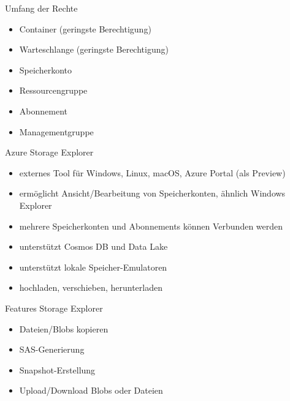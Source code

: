 \begin{flashcard}[Definition]{Umfang der Rechte}
    \begin{itemize}
        \item Container (geringste Berechtigung)
        \item Warteschlange (geringste Berechtigung)
        \item Speicherkonto
        \item Ressourcengruppe
        \item Abonnement
        \item Managementgruppe
    \end{itemize}
\end{flashcard}


\begin{flashcard}[Definition]{Azure Storage Explorer}
    \begin{itemize}
        \item externes Tool für Windows, Linux, macOS, Azure Portal (als Preview)
        \item ermöglicht Ansicht/Bearbeitung von Speicherkonten, ähnlich Windows Explorer
        \item mehrere Speicherkonten und Abonnements können Verbunden werden
        \item unterstützt Cosmos DB und Data Lake
        \item unterstützt lokale Speicher-Emulatoren
        \item hochladen, verschieben, herunterladen
    \end{itemize}
\end{flashcard}

\begin{flashcard}[Definition]{Features Storage Explorer}
    \begin{itemize}
        \item Dateien/Blobs kopieren
        \item SAS-Generierung
        \item Snapshot-Erstellung
        \item Upload/Download Blobs oder Dateien
    \end{itemize}
\end{flashcard}


